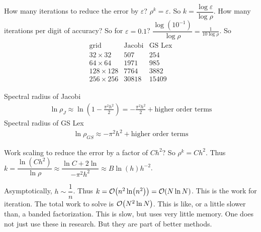 \documentclass{article}
\newcommand{\E}{\varepsilon}
\begin{document}
        How many iterations to reduce the error by $\E$?  $\rho^k = \E$.  So $k = \dfrac{\log \E}{\log\rho}$.  How many iterations per digit of accuracy?  So for $\E = 0.1$?  $\dfrac{\log(10^{-1})}{\log\rho} = \frac{1}{10\log\rho}$.  So
        \begin{align*}
            \begin{array}{c|c|c}
                \text{grid} & \text{Jacobi} & \text{GS Lex} \\\hline
                32\times 32 & 507 & 254 \\
                64\times 64 & 1971 & 985 \\
                128\times 128 & 7764 & 3882 \\
                256\times 256 & 30818 & 15409
            \end{array}
        \end{align*}

        Spectral radius of Jacobi
        \begin{align*}
            \ln\rho_J \approx \ln(1 - \frac{\pi^2 h^2}{2}) = -\frac{\pi^2h^2}{2} + \text{higher order terms}
        \end{align*}
        Spectral radius of GS Lex
        \begin{align}
            \ln\rho_{GS} \approx -\pi^2h^2 + \text{higher order terms}
        \end{align}

        Work scaling to reduce the error by a factor of $Ch^2$?  So $\rho^k = C h^2$.  Thus $k = \dfrac{\ln (Ch^2)}{\ln \rho} \approx \dfrac{\ln C + 2\ln}{-\pi^2 h^2} \approx B \ln (h) h^{-2}$.

        Asymptotically, $h \sim \dfrac{1}{n}$.  Thus $k = \order{n^2\ln(n^2)} = \order{N\ln N}$.  This is the work for iteration.  The total work to solve is $\order{N^2\ln N}$.  This is like, or a little slower than, a banded factorization.  This is slow, but uses very little memory.  One does not just use these in research.  But they are part of better methods.
\end{document}
